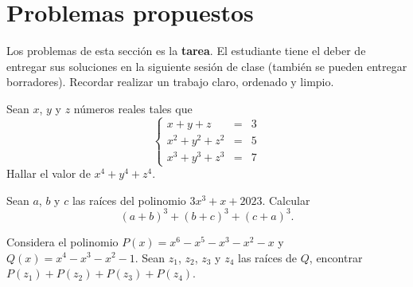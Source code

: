 \section{Problemas propuestos}

Los problemas de esta sección es la \textbf{tarea}.
El estudiante tiene el deber de entregar sus soluciones en la siguiente sesión de clase (también se pueden entregar borradores).
Recordar realizar un trabajo claro, ordenado y limpio.

\begin{problem}
    Sean $x$, $y$ y $z$ números reales tales que
    \[
        \left\{
        \begin{array}{rcl}
            x + y + z       & = & 3 \\
            x^2 + y^2 + z^2 & = & 5 \\
            x^3 + y^3 + z^3 & = & 7
        \end{array}
        \right.
    \]
    Hallar el valor de $x^4 + y^4 + z^4$.
\end{problem}

\begin{problem}
    Sean $a$, $b$ y $c$ las raíces del polinomio $3x^3 + x + 2023$.
    Calcular \[(a + b)^3 + (b + c)^3 + (c + a)^3.\]
\end{problem}

\begin{problem}
    Considera el polinomio $P(x) = x^6 - x^5 - x^3 - x^2 - x$ y $Q(x) = x^4 - x^3 - x^2 - 1$.
    Sean $z_1$, $z_2$, $z_3$ y $z_4$ las raíces de $Q$, encontrar $P(z_1) + P(z_2) + P(z_3) + P(z_4)$.
\end{problem}